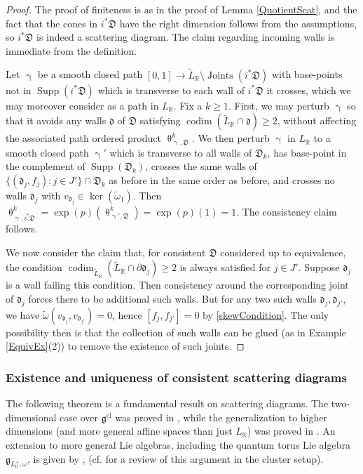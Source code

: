 \documentclass{amsart}
\DeclareMathOperator{\codim}{codim}
\DeclareMathOperator{\cl}{cl}
\DeclareMathOperator{\Joints}{Joints}
\DeclareMathOperator{\Supp}{Supp}
\let\bb=\mathbb
\let\rar=\rightarrow
\let\f=\mathfrak
\let\wt=\widetilde
\renewcommand{\theta}{\uptheta}
\renewcommand{\gamma}{\upgamma}
\theoremstyle{plain}%
\theoremstyle{definition}
\theoremstyle{remark}
\begin{document}
\begin{proof}
The proof of finiteness is as in the proof of Lemma \ref{QuotientScat}, and the fact that the cones in $i^*\f{D}$ have the right dimension follows from the assumptions, so $i^*\f{D}$ is indeed a scattering diagram.  The claim regarding incoming walls is immediate from the definition.


Let $\gamma$ be a smooth closed path $[0,1]\rar \wt{L}_{\bb{R}}\setminus \Joints(i^*\f{D})$ with base-points not in $\Supp(i^*\f{D})$ which is transverse to each wall of $i^*\f{D}$ it crosses, which we may moreover consider as a path in $L_{\bb{R}}$.  Fix a $k\geq 1$.  First, we may perturb $\gamma$ so that it avoids any walls $\f{d}$ of $\f{D}$ satisfying $\codim(\wt{L}_{\bb{R}}\cap\f{d})\geq 2$, without affecting the associated path ordered product $\theta^k_{\gamma,\f{D}}$.  We then perturb $\gamma$ in $L_{\bb{R}}$ to a smooth closed path $\gamma'$ which is transverse to all walls of $\f{D}_{k}$, has base-point in the complement of $\Supp(\f{D}_{k})$, crosses the same walls of $\{(\f{d}_j,f_j)\colon j\in J'\}\cap \f{D}_k$ as before in the same order as before, and crosses no walls $\f{d}_j$ with $v_{\f{d}_j}\in\ker(\wt{\omega}_1)$.  Then $\theta_{\gamma,i^*\f{D}}^k = \exp(p)(\theta_{\gamma',\f{D}}^k)=\exp(p)(1)=1$.  The consistency claim follows. 

We now consider the claim that, for consistent $\f{D}$ considered up to equivalence, the condition $\codim_{\wt{L}_{\bb{R}}}(\wt{L}_{\bb{R}}\cap \partial \f{d}_j) \geq 2$ is always satisfied for $j\in J'$.  Suppose $\f{d}_j$ is a wall failing this condition.  Then consistency around the corresponding joint of $\f{d}_j$ forces there to be additional such walls.  But for any two such walls $\f{d}_j,\f{d}_{j'}$, we have $\wt{\omega}(v_{\f{d}_j},v_{\f{d}_{j'}})=0$, hence $[f_j,f_{j'}]=0$ by \eqref{skewCondition}.  The only possibility then is that the collection of such walls can be glued (as in Example \ref{EquivEx}(2)) to remove the existence of such joints.
\end{proof}


\subsubsection{Existence and uniqueness of consistent scattering diagrams}\label{existence_sssec}\label{ComparisonTricks}

The following theorem is a fundamental result on scattering diagrams.  The two-dimensional case over $\f{g}^{\cl}$ was proved in \cite{KS}, while the generalization to higher dimensions (and more general affine spaces than just $L_{\bb{R}}$) was proved in \cite{GS11}.  An extension to more general Lie algebras, including the quantum torus Lie algebra $\f{g}_{L_0^+,\omega}$, is given by \cite[Prop. 3.2.6, 3.3.2]{WCS}, (cf. \cite[Thm. 1.21]{GHKK} for a review of this argument in the cluster setup). 
\end{document}
